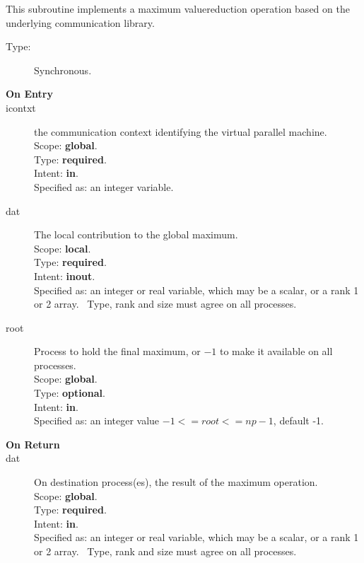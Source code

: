 

This subroutine implements a maximum valuereduction
operation based on the underlying communication library. 
\begin{description}
\item[Type:] Synchronous.
\item[\bf  On Entry ]
\item[icontxt] the communication context identifying the virtual
  parallel machine.\\
Scope: {\bf global}.\\
Type: {\bf required}.\\
Intent: {\bf in}.\\
Specified as: an integer variable.
\item[dat] The local contribution to the global maximum.\\
Scope: {\bf local}.\\
Type: {\bf required}.\\
Intent: {\bf inout}.\\
Specified as: an integer or  real variable, which may be a
scalar, or a rank 1 or 2 array. \
Type, rank and size must agree on all processes.
\item[root] Process to hold the final maximum, or $-1$ to make it available
  on all processes.\\
Scope: {\bf global}.\\
Type: {\bf optional}.\\
Intent: {\bf in}.\\
Specified as: an integer value $-1<= root <= np-1$, default -1. \\
\end{description}


\begin{description}
\item[\bf On Return]
\item[dat] On destination process(es), the result of the maximum operation.\\
Scope: {\bf global}.\\
Type: {\bf required}.\\
Intent: {\bf in}.\\
Specified as: an integer or  real variable, which may be a
scalar, or a rank 1 or 2 array. \
Type, rank and size must agree on all processes.
\end{description}


